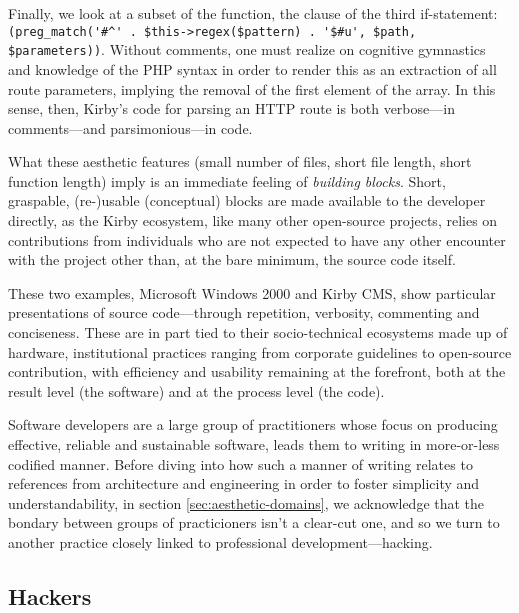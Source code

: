 Finally, we look at a subset of the function, the clause of the third if-statement: \lstinline{(preg_match('#^' . $this->regex($pattern) . '$#u', $path, $parameters))}. Without comments, one must realize on cognitive gymnastics and knowledge of the PHP syntax in order to render this as an extraction of all route parameters, implying the removal of the first element of the array. In this sense, then, Kirby's code for parsing an HTTP route is both verbose—in comments—and parsimonious—in code.

What these aesthetic features (small number of files, short file length, short function length) imply is an immediate feeling of \emph{building blocks}. Short, graspable, (re-)usable (conceptual) blocks are made available to the developer directly, as the Kirby ecosystem, like many other open-source projects, relies on contributions from individuals who are not expected to have any other encounter with the project other than, at the bare minimum, the source code itself.

\vspace{1\baselineskip}

These two examples, Microsoft Windows 2000 and Kirby CMS, show particular presentations of source code—through repetition, verbosity, commenting and conciseness. These are in part tied to their socio-technical ecosystems made up of hardware, institutional practices ranging from corporate guidelines to open-source contribution, with efficiency and usability remaining at the forefront, both at the result level (the software) and at the process level (the code).

Software developers are a large group of practitioners whose focus on producing effective, reliable and sustainable software, leads them to writing in more-or-less codified manner. Before diving into how such a manner of writing relates to references from architecture and engineering in order to foster simplicity and understandability, in section \ref{sec:aesthetic-domains}, we acknowledge that the bondary between groups of practicioners isn't a clear-cut one, and so we turn to another practice closely linked to professional development—hacking.

\subsection{Hackers}
\label{subsec:hackers}

